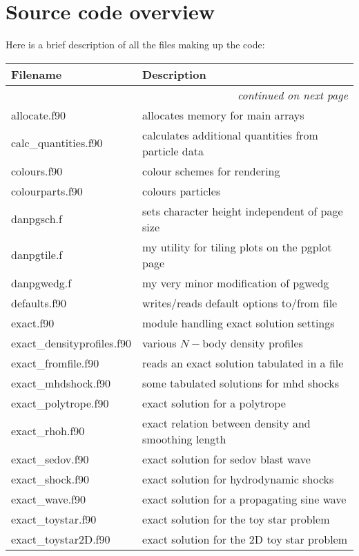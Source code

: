 \documentclass[a4paper,11pt]{article}
\begin{document}
\section{Source code overview}
Here is a brief description of all the files making up the code:
\begin{longtable}{|lp{}|}
\hline
Filename & Description \\
\hline \endhead
\multicolumn{2}{|r|}{\emph{continued on next page}} \\
\hline \endfoot
\hline \endlastfoot
     allocate.f90           & allocates memory for main arrays \\
     calc\_quantities.f90    & calculates additional quantities from particle data \\
     colours.f90            & colour schemes for rendering\\
     colourparts.f90	 & colours particles\\
     danpgsch.f           & sets character height independent of page size\\
     danpgtile.f          & my utility for tiling plots on the pgplot page\\
     danpgwedg.f          & my very minor modification of pgwedg\\
     defaults.f90           & writes/reads default options to/from file\\
     exact.f90              & module handling exact solution settings\\
     exact\_densityprofiles.f90 & various $N-$body density profiles \\
     exact\_fromfile.f90     & reads an exact solution tabulated in a file\\
     exact\_mhdshock.f90     & some tabulated solutions for mhd shocks\\ 
     exact\_polytrope.f90    & exact solution for a polytrope\\
     exact\_rhoh.f90	 & exact relation between density and smoothing length\\
     exact\_sedov.f90        & exact solution for sedov blast wave\\
     exact\_shock.f90        & exact solution for hydrodynamic shocks\\
     exact\_wave.f90         & exact solution for a propagating sine wave\\
     exact\_toystar.f90      & exact solution for the toy star problem\\
     exact\_toystar2D.f90    & exact solution for the 2D toy star problem\\

\end{longtable}
\end{document}

